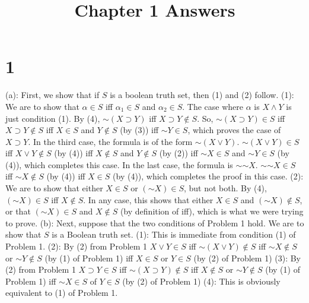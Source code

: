 \documentclass{article}
\title{Chapter 1 Answers}
\newcommand*{\oldneg}{\mathord{\sim}}
\theoremstyle{definition}
\begin{document}
\maketitle

\section*{1}
(a): First, we show that if $S$ is a boolean truth set, then (1) and (2) follow.\newline 
(1): We are to show that $\alpha\in S$ iff $\alpha_1\in S$ and $\alpha_2\in S$. The case where $\alpha$ is $X\wedge Y$ is just condition (1). By (4), 
$\oldneg (X\supset Y)$ iff $X\supset Y\notin S$. So, $\oldneg (X\supset Y)\in S$ iff $X\supset Y\notin S$ iff $X\in S$ and $Y\notin S$ (by (3)) iff 
$\oldneg Y\in S$, which proves the case of $X\supset Y$. In the third case, the formula is of the form $\oldneg (X\vee Y)$. $\oldneg (X\vee Y)\in S$ iff 
$X\vee Y\notin S$ (by (4)) iff $X\notin S$ and $Y\notin S$ (by (2)) iff $\oldneg X\in S$ and $\oldneg Y\in S$ (by (4)), which completes this case. In the 
last case, the formula is $\oldneg\oldneg X$. $\oldneg\oldneg X\in S$ iff $\oldneg X\notin S$ (by (4)) iff $X\in S$ (by (4)), which completes the proof in 
this case.\newline
(2): We are to show that either $X\in S$ or $(\oldneg X)\in S$, but not both. By (4), $(\oldneg X)\in S$ iff $X\notin S$. 
In any case, this shows that either $X\in S$ and $(\oldneg X)\notin S$, or that $(\oldneg X)\in S$ and $X\notin S$ (by definition of iff), which is 
what we were trying to prove.
(b): Next, suppose that the two conditions of Problem 1 hold. We are to show that $S$ is a Boolean truth set. 
(1): This is immediate from condition (1) of Problem 1.\newline
(2): By (2) from Problem 1 $X\vee Y\in S$ iff $\oldneg(X\vee Y)\notin S$ iff $\oldneg X\notin S$ or $\oldneg Y\notin S$ (by (1) of Problem 1) iff 
$X\in S$ or $Y\in S$ (by (2) of Problem 1)\newline
(3): By (2) from Problem 1 $X\supset Y\in S$ iff $\oldneg(X\supset Y)\notin S$ iff $X\notin S$ or $\oldneg Y\notin S$ (by (1) of Problem 1) iff 
$\oldneg X\in S$ of $Y\in S$ (by (2) of Problem 1)\newline
(4): This is obviously equivalent to (1) of Problem 1.
\end{document}
